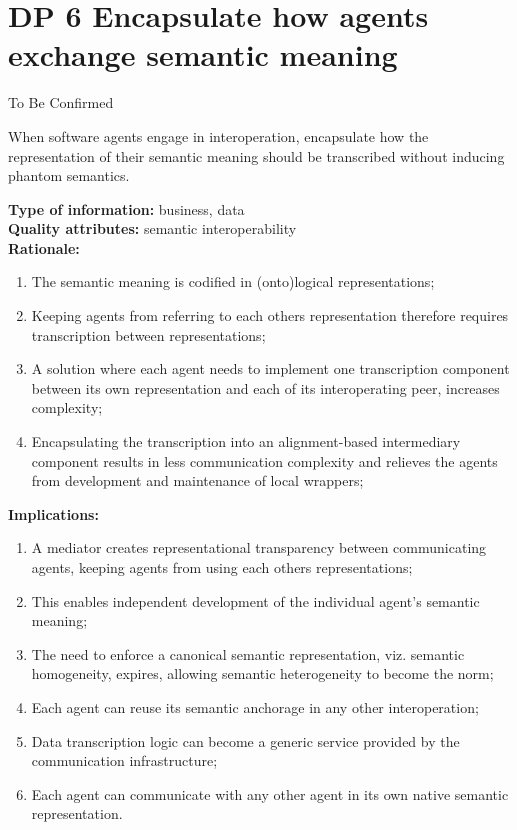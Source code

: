 \documentclass[sort&compress,preprint,authoryear,3p,twocolumn]{elsarticle}
\begin{document}
\hypertarget{dp-6-encapsulate-how-agents-exchange-semantic-meaning}{%
\section{DP 6 Encapsulate how agents exchange semantic
meaning}\label{dp-6-encapsulate-how-agents-exchange-semantic-meaning}}

To Be Confirmed

\begin{mmdp}\label{dp:mediation}

When software agents engage in interoperation, encapsulate how the representation of their semantic meaning should be transcribed without inducing phantom semantics.   

\textbf{Type of information:} business, data  \\
\textbf{Quality attributes:} semantic interoperability   \\
\textbf{Rationale:}
\begin{enumerate}
  \item The semantic meaning is codified in (onto)logical representations;
  \item Keeping agents from referring to each others representation therefore requires transcription between representations;
  \item A solution where each agent needs to implement one transcription component between its own representation and each of its interoperating peer, increases complexity;
  \item Encapsulating the transcription into an alignment-based intermediary component results in less communication complexity and relieves the agents from development and maintenance of local wrappers;
\end{enumerate}
\textbf{Implications:}
\begin{enumerate}
  \item A mediator creates representational transparency between communicating agents, keeping agents from using each others representations;
  \item This enables independent development of the individual agent’s semantic meaning;
  \item The need to enforce a canonical semantic representation, viz. semantic homogeneity, expires, allowing semantic heterogeneity to become the norm;
  \item Each agent can reuse its semantic anchorage in any other interoperation;
  \item Data transcription logic can become a generic service provided by the communication infrastructure;
  \item Each agent can communicate with any other agent in its own native semantic representation.
\end{enumerate}  
\end{mmdp}
\end{document}
